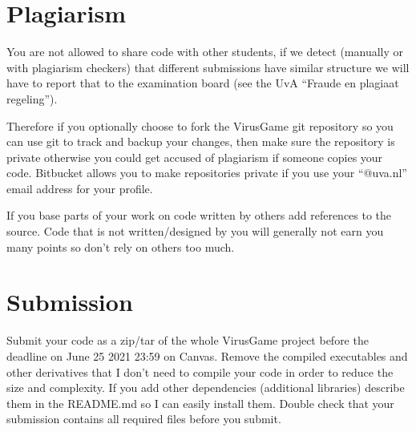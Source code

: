 \documentclass[12pt]{article}
\begin{document}
\section{Plagiarism}
You are not allowed to share code with other students, if we detect
(manually or with plagiarism checkers) that different submissions have
similar structure we will have to report that to the examination
board (see the UvA ``Fraude en plagiaat regeling'').

Therefore if you optionally choose to fork the VirusGame git
repository so you can use git to track and backup your changes, then
make sure the repository is private otherwise you could get accused of
plagiarism if someone copies your code. Bitbucket allows you to make
repositories private if you use your ``@uva.nl'' email address for
your profile.

If you base parts of your work on code written by others add
references to the source. Code that is not written/designed by you
will generally not earn you many points so don't rely on others too
much.

\section{Submission}
Submit your code as a zip/tar of the whole VirusGame project before
the deadline on June 25 2021 23:59 on Canvas. Remove the compiled
executables and other derivatives that I don't need to compile your
code in order to reduce the size and complexity. If you add other
dependencies (additional libraries) describe them in the README.md so
I can easily install them. Double check that your submission contains
all required files before you submit.
\end{document}
